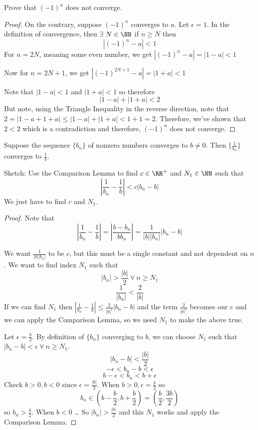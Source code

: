\documentclass[12pt]{scrartcl}
\begin{document}
\begin{example}
  Prove that $(-1)^n$ does not converge. 

  \begin{proof}
    On the contrary, suppose $(-1)^n$ converges to $a$. Let $\epsilon = 1$. In the definition of 
    convergence, then $\exists \ N \in \NN$ if $n \geq N$ then 
    \[|(-1)^n - a| < 1\]
    For $n = 2N$, meaning some even number, we get $|(-1)^n - a| = |1 - a| < 1$

    Now for $n = 2N + 1$, we get $|(-1)^{2N+ 1} -a| = |1 + a| < 1$

    Note that $|1 - a| < 1$ and $|1 + a| < 1$ so therefore
    \[|1 - a| + |1 + a| < 2\]
    But note, using the Triangle Inequality in the reverse direction, 
    note that $2 = |1 - a + 1 + a| \leq |1 - a| + |1 + a| < 1 + 1 = 2$. Therefore, we've shown 
    that $2 < 2$ which is a contradiction and therefore, $(-1)^n$ does not converge. 
  \end{proof}
\end{example}

\begin{lemma}
  Suppose the sequence $\{b_n\}$ of nonzero numbers converges to $b \neq 0$. Then 
  $\{\frac{1}{b_n}\}$ converges to $\frac{1}{b}$.
    
    Sketch: Use the Comparison Lemma to find $c \in\RR^+$ and $N_1 \in \NN$ such that 
    \[|\frac{1}{b_n} - \frac{1}{b}| < c|b_n - b|\]
    We just have to find $c$ and $N_1$. 

  \begin{proof}
    Note that 
    \[|\frac{1}{b_n} - \frac{1}{b}| = |\frac{b - b_n}{bb_n}| = \frac{1}{|b||b_n|}|b_n - b|\]

    We want $\frac{1}{|b||b_n|}$ to be $c$, but this must be a single constant and not dependent on $n$. 
    We want to find index $N_1$ such that \[|b_n| > \frac{|b|}{2} \ \forall \ n \geq N_1\]
    \[\frac{1}{|b_n|} < \frac{2}{|b|}\]
    If we can find $N_1$ then $|\frac{1}{b_n} - \frac{1}{b}| \leq \frac{2}{|b|^2}|b_n - b|$ and the term
    $\frac{2}{|b|^2}$ becomes our $c$ and we can apply the Comparison Lemma, so we need $N_1$ to make the 
    above true.

    Let $\epsilon = \frac{b}{2}$. By definition of $\{b_n\}$ converging to $b$, we can choose $N_1$
    such that $|b_n - b| < \epsilon \ \forall \ n \geq N_1$.
    \[|b_n - b| < \frac{|b|}{2}\]
    \[-\epsilon < b_n - b < \epsilon\]
    \[b - \epsilon < b_n < b + \epsilon\]
    Check $b > 0, b < 0$ since $\epsilon = \frac{|b|}{2}$. When $b> 0, \epsilon = \frac{b}{2}$ so 
    \[b_n \in (b- \frac{b}{2}, b + \frac{b}{2}) = (\frac{b}{2}, \frac{3b}{2}  )\]
    so $b_n > \frac{b}{2}$. When $b < 0$ \dots
    So $|b_n| > \frac{|b|}{2}$ and this $N_1$ works and apply the Comparison Lemma.
  \end{proof}
\end{lemma}
\end{document}
